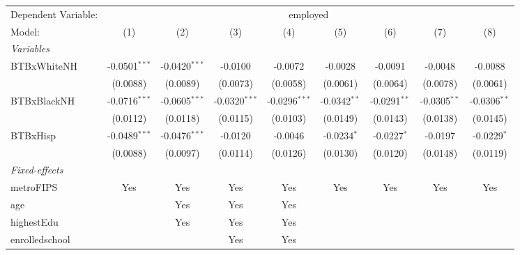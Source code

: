 
\begingroup
\centering
\begin{tabular}{lcccccccc}
   \tabularnewline \midrule \midrule
   Dependent Variable: & \multicolumn{8}{c}{employed}\\
   Model:                   & (1)             & (2)             & (3)             & (4)             & (5)            & (6)            & (7)            & (8)\\  
   \midrule
   \emph{Variables}\\
   BTBxWhiteNH              & -0.0501$^{***}$ & -0.0420$^{***}$ & -0.0100         & -0.0072         & -0.0028        & -0.0091        & -0.0048        & -0.0088\\   
                            & (0.0088)        & (0.0089)        & (0.0073)        & (0.0058)        & (0.0061)       & (0.0064)       & (0.0078)       & (0.0061)\\   
   BTBxBlackNH              & -0.0716$^{***}$ & -0.0605$^{***}$ & -0.0320$^{***}$ & -0.0296$^{***}$ & -0.0342$^{**}$ & -0.0291$^{**}$ & -0.0305$^{**}$ & -0.0306$^{**}$\\   
                            & (0.0112)        & (0.0118)        & (0.0115)        & (0.0103)        & (0.0149)       & (0.0143)       & (0.0138)       & (0.0145)\\   
   BTBxHisp                 & -0.0489$^{***}$ & -0.0476$^{***}$ & -0.0120         & -0.0046         & -0.0234$^{*}$  & -0.0227$^{*}$  & -0.0197        & -0.0229$^{*}$\\   
                            & (0.0088)        & (0.0097)        & (0.0114)        & (0.0126)        & (0.0130)       & (0.0120)       & (0.0148)       & (0.0119)\\   
   \midrule
   \emph{Fixed-effects}\\
   metroFIPS                & Yes             & Yes             & Yes             & Yes             & Yes            & Yes            & Yes            & Yes\\  
   age                      &                 & Yes             & Yes             & Yes             &                &                &                & \\  
   highestEdu               &                 & Yes             & Yes             & Yes             &                &                &                & \\  
   enrolledschool           &                 &                 & Yes             & Yes             &                &                &                & \\  

\end{tabular}
